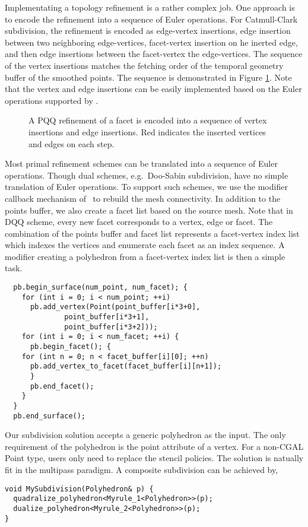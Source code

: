 Implementating a topology refinement is a rather complex job.  One
approach is to encode the refinement into a sequence of Euler
operations. For Catmull-Clark subdivision, the refinement is encoded
as edge-vertex insertions, edge insertion between two neighboring
edge-vertices, facet-vertex insertion on he inerted edge, and then
edge insertions between the facet-vertex the edge-vertices. The
sequence of the vertex insertions matches the fetching order of the
temporal geometry buffer of the smoothed points. The sequence is
demonstrated in Figure \ref{fig:CCRefinement}. Note that the vertex
and edge insertions can be easily implemented based on the Euler
operations supported by \cgalpoly.

\begin{figure}
  \centering
  \caption{A PQQ refinement of a facet is encoded into a sequence of
  vertex insertions and edge insertions. Red indicates the inserted
  vertices and edges on each step.}
  \label{fig:CCRefinement}
\end{figure}

Most primal refinement schemes can be translated into a sequence of
Euler operations. Though dual schemes, e.g.\ Doo-Sabin subdivision,
have no simple translation of Euler operations.  To support such
schemes, we use the modifier callback mechanism of \cgalpoly\ to
rebuild the mesh connectivity. In addition to the points buffer, we
also create a facet list based on the source mesh. Note that in DQQ
scheme, every new facet corresponds to a vertex, edge or facet. The
combination of the points buffer and facet list represents a
facet-vertex index list which indexes the vertices and enumerate each
facet as an index sequence. A modifier creating a polyhedron from a
facet-vertex index list is then a simple task.

\begin{lstlisting}
  pb.begin_surface(num_point, num_facet); {
    for (int i = 0; i < num_point; ++i) 
      pb.add_vertex(Point(point_buffer[i*3+0], 
			  point_buffer[i*3+1], 
			  point_buffer[i*3+2]));	
    for (int i = 0; i < num_facet; ++i) {
      pb.begin_facet(); {
	for (int n = 0; n < facet_buffer[i][0]; ++n)
	  pb.add_vertex_to_facet(facet_buffer[i][n+1]);
      }
      pb.end_facet();
    }
  }
  pb.end_surface();
\end{lstlisting}

Our subdivision solution accepts a generic polyhedron as the input.
The only requirement of the polyhedron is the point attribute of a
vertex. For a non-CGAL Point type, users only need to replace the
stencil policies.  The solution is natually fit in the multipass
paradigm.  A composite subdivision can be achieved by,
\begin{lstlisting}
void MySubdivision(Polyhedron& p) {
  quadralize_polyhedron<Myrule_1<Polyhedron>>(p);
  dualize_polyhedron<Myrule_2<Polyhedron>>(p);
} 
\end{lstlisting}


